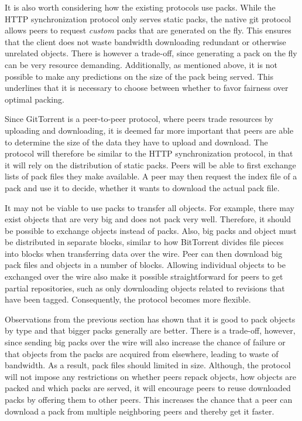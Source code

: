 It is also worth considering how the existing protocols use packs.
While the HTTP synchronization protocol only serves static packs, the native git
protocol allows peers to request \emph{custom} packs that are
generated on the fly. This ensures that the client does not waste
bandwidth downloading redundant or otherwise unrelated objects.  There
is however a trade-off, since generating a pack on the fly can be very
resource demanding. Additionally, as mentioned above, it is
not possible to make any predictions on the size of the pack being
served. This underlines that it is necessary to choose between whether
to favor fairness over optimal packing.

Since GitTorrent is a peer-to-peer protocol, where peers trade
resources by uploading and downloading, it is deemed far more
important that peers are able to determine the size of the data they
have to upload and download. The protocol will therefore be similar to
the HTTP synchronization protocol, in that it will rely on the distribution of static
packs. Peers will be able to first exchange lists of pack files they
make available. A peer may then request the index file of a pack and
use it to decide, whether it wants to download the actual pack file.

It may not be viable to use packs to transfer all objects. For
example, there may exist objects that are very big and does not pack
very well. Therefore, it should be possible to exchange objects
instead of packs. Also, big packs and object must be distributed in
separate blocks, similar to how BitTorrent divides file pieces into
blocks when transferring data over the wire. Peer can then download
big pack files and objects in a number of blocks. Allowing individual objects
to be exchanged over the wire also make it possible straightforward for peers to get
partial repositories, such as only downloading objects related to
revisions that have been tagged. Consequently, the protocol becomes
more flexible.

Observations from the previous section has shown that it is good to
pack objects by type and that bigger packs generally are better. There
is a trade-off, however, since sending big packs over the wire will
also increase the chance of failure or that objects from the packs are
acquired from elsewhere, leading to waste of bandwidth.  As a result,
pack files should limited in size.  Although, the protocol will not
impose any restrictions on whether peers repack objects, how objects
are packed and which packs are served, it will encourage peers to
reuse downloaded packs by offering them to other peers. This increases
the chance that a peer can download a pack from multiple neighboring
peers and thereby get it faster. 

